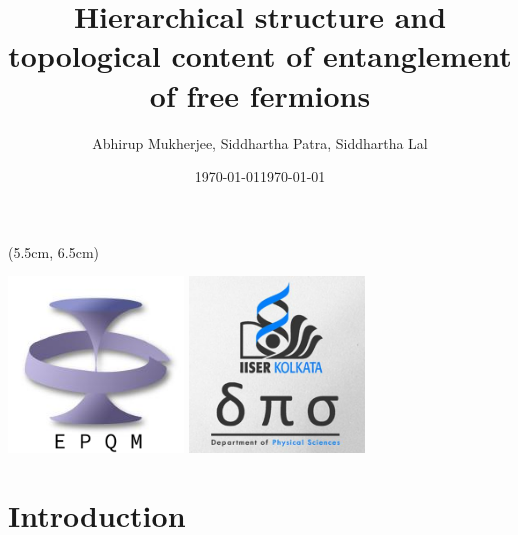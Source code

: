 \documentclass[11pt,aspectratio=169]{beamer}
\title{
{Hierarchical structure and topological content of entanglement of free fermions}
}
\date{\today}
\author{Abhirup Mukherjee, Siddhartha Patra, Siddhartha Lal}
\institute{Department of Physical Sciences, IISER Kolkata, Mohanpur}
\date{\today}
\begin{document}
\centering

\begin{frame}
\maketitle
\begin{textblock*}{0.4\textwidth}(5.5cm, 6.5cm)
	\centering
	\vspace*{\fill}

	\includegraphics[width=0.35\textwidth]{figures/epqm_logo_mod.jpeg}
	\hspace*{\fill}
	\includegraphics[width=0.35\textwidth]{figures/dps_logo.jpeg}

	\vspace*{\fill}
\end{textblock*}
\end{frame}

\section{Introduction}
\end{document}
